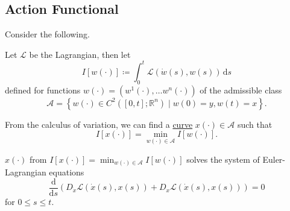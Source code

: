 \subsection{Action Functional}
Consider the following.

\begin{definition}[Action]
	Let \(\mathcal{L} \) be the Lagrangian, then let
	\[
		I[w(\cdot)] \coloneqq \int_{0}^{t} \mathcal{L} (\dot{w}(s), w(s)) \,\mathrm{d}s
	\]
	defined for functions \(w(\cdot) = (w^1(\cdot), \ldots w^n(\cdot))\) of the admissible class
	\[
		\mathcal{A} =\left\{ w(\cdot)\in C^2([0, t]; \mathbb{R} ^n) \mid w(0)= y, w(t)= x\right\}.
	\]
\end{definition}

From the calculus of variation, we can find a \hyperref[def:curve]{curve} \(x(\cdot)\in \mathcal{A} \) such that
\[
	I[x(\cdot)] = \min _{w(\cdot)\in \mathcal{A} }I[w(\cdot)].
\]

\begin{theorem}\label{thm:Euler-Lagrangian-eq}
	\(x(\cdot)\) from \(I[x(\cdot)] = \min _{w(\cdot)\in \mathcal{A} }I[w(\cdot)]\) solves the system of Euler-Lagrangian equations
	\[
		\frac{\mathrm{d}}{\mathrm{d}s} \left( D_{\dot{x}} \mathcal{L} (\dot{x}(s), x(s)) + D_x \mathcal{L} (\dot{x}(s), x(s)) \right) = 0
	\]
	for \(0 \leq s \leq t\).
\end{theorem}